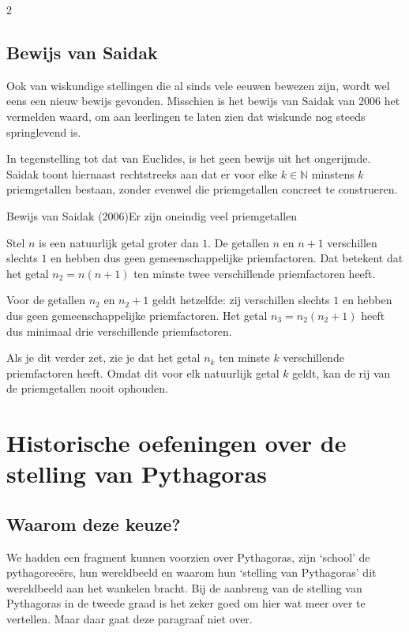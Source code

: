 \begin{multicols}{2}

\subsection*{Bewijs van Saidak}
Ook van wiskundige stellingen die al sinds vele eeuwen bewezen zijn, wordt wel eens een nieuw bewijs gevonden. Misschien is het bewijs van Saidak van 2006 het vermelden waard, om aan leerlingen te laten zien dat wiskunde nog steeds springlevend is.

In tegenstelling tot dat van Euclides, is het geen bewijs uit het ongerijmde. Saidak toont hiernaast rechtstreeks aan dat er voor elke $k\in \mathbb{N}$ minstens $k$ priemgetallen bestaan, zonder evenwel die priemgetallen concreet te construeren.
\vfill\null
\columnbreak

\begin{kader}{Bewijs van Saidak (2006)}{Er zijn oneindig veel priemgetallen}

Stel $n$ is een natuurlijk getal groter dan $1$. De getallen $n$ en $n + 1$ verschillen slechts $1$ en hebben dus geen gemeenschappelijke priemfactoren. Dat betekent dat het getal $n_2 = n(n + 1)$ ten minste twee verschillende priemfactoren heeft. 

Voor de getallen $n_2$ en $n_2 + 1$ geldt hetzelfde: zij verschillen slechts $1$ en hebben dus geen gemeenschappelijke priemfactoren. Het getal $n_3 = n_2(n_2 + 1)$ heeft dus minimaal drie verschillende priemfactoren. 

Als je dit verder zet, zie je dat het getal $n_k$ ten minste $k$ verschillende priemfactoren heeft. Omdat dit voor elk natuurlijk getal $k$ geldt, kan de rij van de priemgetallen nooit ophouden.

\end{kader}
\clearpage

\section{Historische oefeningen over de stelling van Pythagoras}
	 \subsection*{Waarom deze keuze?}

    We hadden een fragment kunnen voorzien over Pythagoras, zijn `school' de pythagoreeërs, hun wereldbeeld en waarom hun `stelling van Pythagoras' dit wereldbeeld aan het wankelen bracht. Bij de aanbreng van de stelling van Pythagoras in de tweede graad is het zeker goed om hier wat meer over te vertellen. Maar daar gaat deze paragraaf niet over. 
    

\end{multicols}
